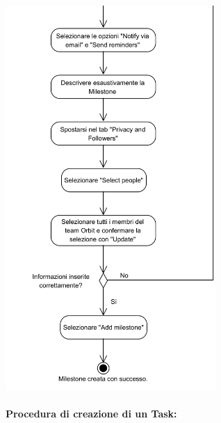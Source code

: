 \begin{center}
	\includegraphics[width=8cm]{../../documenti/NormeDiProgetto/DiagrammiProcedure/CreazioneMilestone2.png}
\end{center}

\newpage
\paragraph{Procedura di creazione di un Task:}

